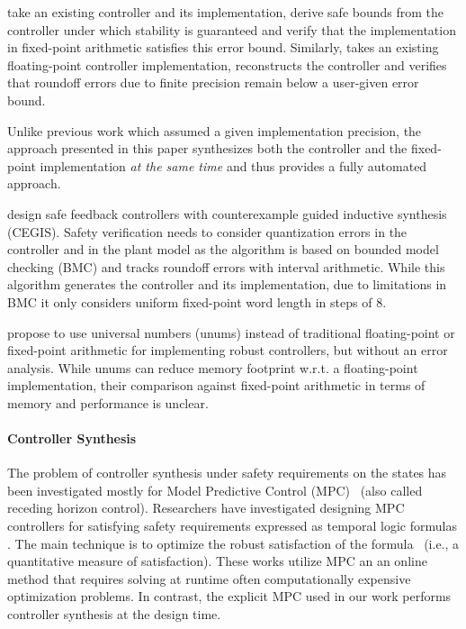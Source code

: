 \citet{Anta10} take an existing controller and its implementation, derive safe
bounds from the controller under which stability is guaranteed and verify that
the implementation in fixed-point arithmetic satisfies this error bound.
Similarly, \citet{ParkPSL17} takes an existing floating-point controller
implementation, reconstructs the controller and verifies that roundoff errors
due to finite precision remain below a user-given error bound.

Unlike previous work which assumed a given implementation precision, the
approach presented in this paper synthesizes both the controller and the
fixed-point implementation \emph{at the same time} and thus provides
a fully automated approach.

\citet{Abate2017} design safe feedback controllers with counterexample guided
inductive synthesis (CEGIS). Safety verification needs to consider quantization
errors in the controller and in the plant model as the algorithm is based on
bounded model checking (BMC) and tracks roundoff errors with interval
arithmetic. While this algorithm generates the controller and its
implementation, due to limitations in BMC it only considers uniform fixed-point
word length in steps of 8.

\citet{memoryMPC} propose to use universal numbers (unums) instead of
traditional floating-point or fixed-point arithmetic for implementing robust
controllers, but without an error analysis. While unums can reduce memory
footprint w.r.t. a floating-point implementation, their comparison against
fixed-point arithmetic in terms of memory and performance is unclear.

\paragraph{Controller Synthesis}
The problem of controller synthesis under safety requirements on the states has
been investigated mostly for Model Predictive Control (MPC)~\cite{camacho2013model} (also called receding horizon control).
Researchers have investigated designing MPC controllers for satisfying safety requirements expressed as temporal logic formulas 
\cite{FMPS18,KaramanSF08,raman2014model,WongpiromsarnTM12,pant2017smooth,kim2017dynamic}.
The main technique is to optimize the robust satisfaction of 
the formula~\cite{donze2010robust} (i.e., a quantitative measure of satisfaction).
These works utilize MPC an an online method that requires solving at runtime often computationally 
expensive optimization problems. In contrast, the explicit MPC used in our work performs controller synthesis at the design time.

